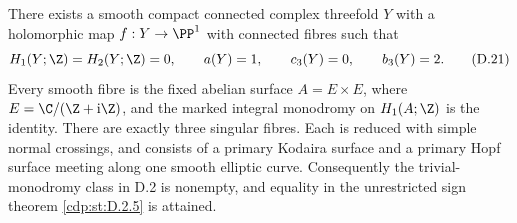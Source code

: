 
\begin{proposition}\label{cdp:st:D.2.7}

There exists a smooth compact connected complex threefold $Y$
with a holomorphic map $f:Y\to\PP^1$ with connected fibres such
that
\[
 H_1(Y;\Z)=H_2(Y;\Z)=0,\qquad
 a(Y)=1,\qquad c_3(Y)=0,\qquad b_3(Y)=2.
\tag{D.21}\label{cdp:eq:D.21}
\]
Every smooth fibre is the fixed abelian surface
$A=E\times E$, where $E=\C/(\Z+\mathrm i\Z)$, and the marked
integral monodromy on $H_1(A;\Z)$ is the identity. There are
exactly three singular fibres. Each is reduced with simple
normal crossings, and consists of a primary Kodaira surface
and a primary Hopf surface meeting along one smooth elliptic
curve. Consequently the trivial-monodromy class in D.2 is
nonempty, and equality in the unrestricted sign theorem
\ref{cdp:st:D.2.5} is attained.
\end{proposition}
